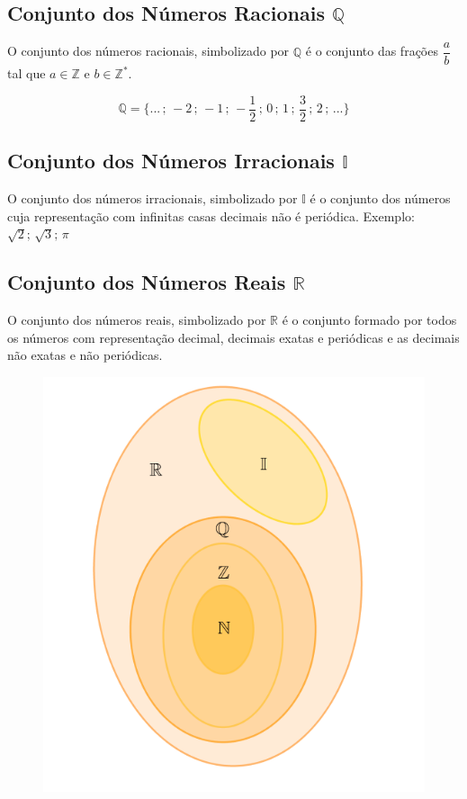 \subsection{Conjunto  dos Números Racionais $\mathbb{Q}$}

O conjunto dos números racionais, simbolizado por $\mathbb{Q}$ é o conjunto das frações $\dfrac{a}{b}$ tal que $a \in \mathbb{Z}$ e $b \in \mathbb{Z}^*$.

$$\mathbb{Q} = \{...\,;\,-2\,;\,-1\,;\, -\frac{1}{2} \,;\,0 \, ; \, 1\, ;\,\frac{3}{2} \,; \,2\,; \, ...\}$$
\subsection{Conjunto  dos Números Irracionais $\mathbb{I}$}

O conjunto dos números irracionais, simbolizado por $\mathbb{I}$ é o conjunto dos números cuja representação com infinitas casas decimais não é periódica. Exemplo: $\sqrt{2};\,\sqrt{3};\,\pi$


\subsection{Conjunto  dos Números Reais $\mathbb{R}$}

O conjunto dos números reais, simbolizado por $\mathbb{R}$ é o conjunto formado por todos os números com representação decimal, decimais exatas e periódicas e as decimais não exatas e não periódicas.
\begin{figure}[H]
	\centering
	
	\includegraphics[scale=3.5]{imagens/conjunto-reais.png}

\end{figure}


